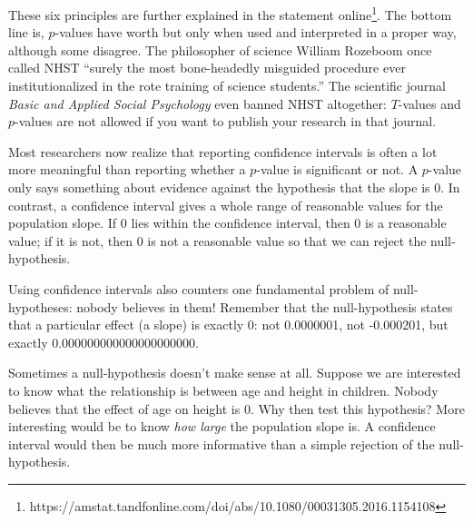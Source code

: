 \documentclass[]{book}\usepackage[]{graphicx}\usepackage[]{color}
\begin{document}
These six principles are further explained in the statement online{\footnote{https://amstat.tandfonline.com/doi/abs/10.1080/00031305.2016.1154108}}. The bottom line is, $p$-values have worth but only when used and interpreted in a proper way, although some disagree. The philosopher of science William Rozeboom once called NHST “surely the most bone-headedly misguided procedure ever institutionalized in the rote training of science students.” The scientific journal \textit{Basic and Applied Social Psychology} even banned NHST altogether: $T$-values and $p$-values are not allowed if you want to publish your research in that journal.

Most researchers now realize that reporting confidence intervals is often a lot more meaningful than reporting whether a $p$-value is significant or not. A $p$-value only says something about evidence against the hypothesis that the slope is 0. In contrast, a confidence interval gives a whole range of reasonable values for the population slope. If 0 lies within the confidence interval, then 0 is a reasonable value; if it is not, then 0 is not a reasonable value so that we can reject the null-hypothesis.

Using confidence intervals also counters one fundamental problem of null-hypotheses: nobody believes in them! Remember that the null-hypothesis states that a particular effect (a slope) is exactly 0: not 0.0000001, not -0.000201, but exactly 0.000000000000000000000.

Sometimes a null-hypothesis doesn't make sense at all. Suppose we are interested to know what the relationship is between age and height in children. Nobody believes that the effect of age on height is 0. Why then test this hypothesis? More interesting would be to know \textit{how large} the population slope is. A confidence interval would then be much more informative than a simple rejection of the null-hypothesis.
\end{document}
